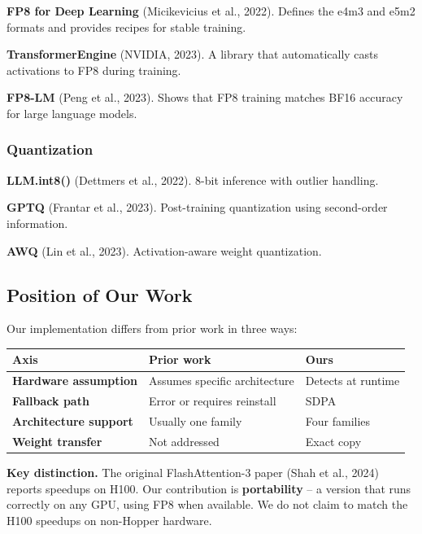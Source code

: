 \textbf{FP8 for Deep Learning} (Micikevicius et al., 2022). Defines the e4m3 and 
e5m2 formats and provides recipes for stable training.

\textbf{TransformerEngine} (NVIDIA, 2023). A library that automatically casts 
activations to FP8 during training.

\textbf{FP8-LM} (Peng et al., 2023). Shows that FP8 training matches BF16 
accuracy for large language models.

\subsubsection{Quantization}

\textbf{LLM.int8()} (Dettmers et al., 2022). 8-bit inference with outlier handling.

\textbf{GPTQ} (Frantar et al., 2023). Post-training quantization using second-order 
information.

\textbf{AWQ} (Lin et al., 2023). Activation-aware weight quantization.

\subsection{Position of Our Work}

Our implementation differs from prior work in three ways:

\begin{table}[H]
\centering
\small
\begin{tabular}{lll}
\toprule
\textbf{Axis} & \textbf{Prior work} & \textbf{Ours} \\
\midrule
\textbf{Hardware assumption} & Assumes specific architecture & Detects at runtime \\
\textbf{Fallback path} & Error or requires reinstall & SDPA \\
\textbf{Architecture support} & Usually one family & Four families \\
\textbf{Weight transfer} & Not addressed & Exact copy \\
\bottomrule
\end{tabular}
\end{table}

\textbf{Key distinction.} The original FlashAttention-3 paper (Shah et al., 2024) 
reports speedups on H100. Our contribution is \textbf{portability} -- a version 
that runs correctly on any GPU, using FP8 when available. We do not claim 
to match the H100 speedups on non-Hopper hardware.



